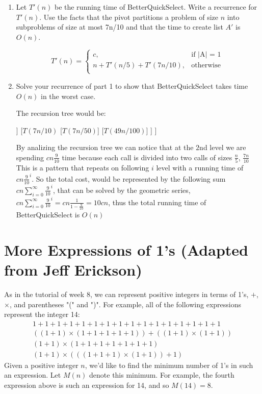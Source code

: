 \documentclass[11pt]{article}
\def\question#1{\red{#1}}
\def\soln#1{\par\blu{#1}} %
\def\blu#1{{\color{blu}#1}}
\def\red#1{{\color{red}#1}}
\begin{document}
\begin{enumerate}
\item 
Let $T'(n)$ be the running time of BetterQuickSelect.
\question{Write a recurrence for $T'(n)$.} Use
the facts that the pivot partitions a problem of size $n$ into subproblems of size at most 7n/10
and that the time to create list $A'$ is $O(n)$. \\
\soln{
  \[
   T'(n) = \left \{\begin{array}{ll}
      c, & \mbox{if |A| = 1 } \\[.3in]
      n + T'(n/5) + T'(7n/10), & \mbox{otherwise} \\
      \end{array} \right.
  \]
}

\item \question{Solve your recurrence of part 1 to show that BetterQuickSelect takes time $O(n)$ in the worst case.}
\soln{
  The recursion tree would be:
  \begin{center}
    \begin{forest}
      [$T(n)$
        [$T(n/5)$
          [$T(n/25)$]
          [$T(7n/20)$]
        ]
        [$T(7n/10)$
          [$T(7n/50)$]
          [$T(49n/100)$]
        ]
      ]
    \end{forest}
  \end{center}
  By analizing the recursion tree we can notice that at the $2$nd level we are spending $cn\frac{9}{10}$ time 
  because each call is divided into two calls of sizes $\frac{n}{5}$, $\frac{7n}{10}$ This is a pattern 
  that repeats on following $i$ level with a running time of $cn\frac{9}{10}^i$. So the total cost, 
  would be represented by the following sum $cn\sum_{i=0}^{\infty} \frac{9}{10}^i$, that can be solved 
  by the geometric series, $cn\sum_{i=0}^{\infty} \frac{9}{10}^i = cn\frac{1}{1-\frac{9}{10}} = 10cn$, 
  thus the total running time of BetterQuickSelect is $O(n)$
}
\end{enumerate}

\section{More Expressions of 1's (Adapted from Jeff Erickson)}
\label{sec-3}

As in the tutorial of week 8, we can represent positive integers in
terms of 1's, $+$, $\times$, and parentheses "(" and ")".  For
example, all of the following expressions represent the integer 14:
\[
\begin{array}{l}
1 + 1 + 1 + 1 + 1 + 1 + 1 + 1 + 1 + 1 + 1 + 1 + 1 + 1 + 1 + 1 \\
((1 + 1) \times (1 + 1 + 1 + 1 + 1)) + ((1 + 1) \times (1 + 1)) \\
(1 + 1) \times (1 + 1 + 1 + 1 + 1 + 1 + 1) \\
(1 + 1) \times (((1 + 1 + 1) \times (1 + 1)) + 1) 
\end{array}
\]
Given a positive integer $n$, we'd like to find the minimum number of
1's in such an expression.  Let $M(n)$ denote this minimum.  For
example, the fourth expression above is such an expression for 14, and
so $M(14) = 8$.
\end{document}
